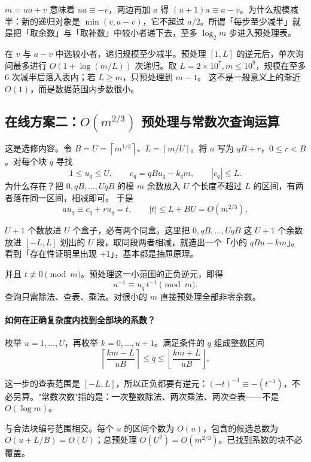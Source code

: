 \documentclass[UTF8,a4paper,11pt,oneside,openany,fontset=fandol]{ctexbook}
\theoremstyle{definition}
\newcommand{\floor}[1]{\left\lfloor #1\right\rfloor}
\newcommand{\ceil}[1]{\left\lceil #1\right\rceil}
\begin{document}
\begin{tip}[这个恒等式从哪来]
$m=ua+v$ 意味着 $ua\equiv-v$，两边再加 $a$ 得 $(u+1)a\equiv a-v$。为什么规模减半：新的递归对象是 $\min(v,a-v)$，它不超过 $a/2$。所谓「每步至少减半」就是把「取余数」与「取补数」中较小者递下去，至多 $\log_2 m$ 步进入预处理表。
\end{tip}

在 $v$ 与 $a-v$ 中选较小者，递归规模至少减半。预处理 $[1,L]$ 的逆元后，单次询问最多进行 $O(1+\log(m/L))$ 次递归。取 $L=2\times10^7,m\le10^9$，规模在至多 $6$ 次减半后落入表内；若 $L\ge m$，只预处理到 $m-1$。
这不是一般意义上的渐近 $O(1)$，而是数据范围内步数很小。

\subsection{在线方案二：\texorpdfstring{$O(m^{2/3})$}{O(m2/3)} 预处理与常数次查询运算}
这是选修内容。令 $B=U=\ceil{m^{1/3}}$、$L=\ceil{m/U}$。将 $a$ 写为 $qB+r$，$0\le r<B$。对每个块 $q$ 寻找
\[
1\le u_q\le U,\qquad c_q=qBu_q-k_qm,\qquad |c_q|\le L.
\]
为什么存在？把 $0,qB,\ldots,UqB$ 的模 $m$ 余数放入 $U$ 个长度不超过 $L$ 的区间，有两者落在同一区间，相减即可。
于是
\[
 a u_q\equiv c_q+ru_q=t,\qquad |t|\le L+BU=O(m^{2/3}),
\]

\begin{tip}[抽屉原理一句话]
$U+1$ 个数放进 $U$ 个盒子，必有两个同盒。这里把 $0,qB,\ldots,UqB$ 这 $U+1$ 个余数放进 $[-L,L]$ 划出的 $U$ 段，取同段两者相减，就造出一个「小的 $qBu-km$」。看到「存在性证明里出现 $+1$」，基本都是抽屉原理。
\end{tip}

并且 $t\not\equiv0\pmod m$。预处理这一小范围的正负逆元，即得
\[
 a^{-1}\equiv u_q\,t^{-1}\pmod m.
\]
查询只需除法、查表、乘法。对很小的 $m$ 直接预处理全部非零余数。

\paragraph{如何在正确复杂度内找到全部块的系数？}
枚举 $u=1,\ldots,U$，再枚举 $k=0,\ldots,u+1$。满足条件的 $q$ 组成整数区间
\[
 \ceil{\frac{km-L}{uB}}\le q\le\floor{\frac{km+L}{uB}},
\]

\begin{tip}
这一步的查表范围是 $[-L,L]$，所以正负都要有逆元：$(-t)^{-1}\equiv-(t^{-1})$，不必另算。"常数次数"指的是：一次整数除法、两次乘法、两次查表——不是 $O(\log m)$。
\end{tip}

与合法块编号范围相交。每个 $u$ 的区间个数为 $O(u)$，包含的候选总数为 $O(u+L/B)=O(U)$；总预处理 $O(U^2)=O(m^{2/3})$。已找到系数的块不必覆盖。
\end{document}

